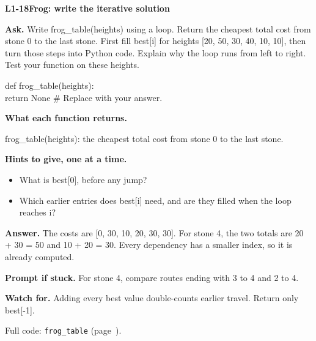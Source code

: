 \documentclass[11pt,a4paper]{article}
\begin{document}
\noindent\begin{minipage}{\textwidth}
{\color{teal}\textbf{L1-18}}\quad \textbf{Frog: write the iterative solution}\par\smallskip
\textbf{Ask.} Write frog\_table(heights) using a loop. Return the cheapest total cost from stone 0 to the last stone. First fill best[i] for heights [20, 50, 30, 40, 10, 10], then turn those steps into Python code. Explain why the loop runs from left to right. Test your function on these heights.\par\smallskip
\par{}\par\smallskip\noindent\colorbox{codepaper}{\parbox{\dimexpr\linewidth-2\fboxsep\relax}{\small\ttfamily\raggedright def frog\_table(heights):\\\hspace*{2.4em}return None  \# Replace with your answer.}}\par
{\small\textbf{What each function returns.}\par frog\_table(heights): the cheapest total cost from stone 0 to the last stone.\par }
{\small\textbf{Hints to give, one at a time.}}\begin{itemize}\item What is best[0], before any jump?\item Which earlier entries does best[i] need, and are they filled when the loop reaches i?\end{itemize}
\textbf{Answer.} The costs are [0, 30, 10, 20, 30, 30]. For stone 4, the two totals are 20 + 30 = 50 and 10 + 20 = 30. Every dependency has a smaller index, so it is already computed.\par\smallskip
\textbf{Prompt if stuck.} For stone 4, compare routes ending with 3 to 4 and 2 to 4.\par\smallskip
\textbf{Watch for.} Adding every best value double-counts earlier travel. Return only best[-1].\par\smallskip Full code: \texttt{frog\_table} (page~\pageref{L1-code-frog_table}).
\end{minipage}\par{}\medskip
\end{document}
